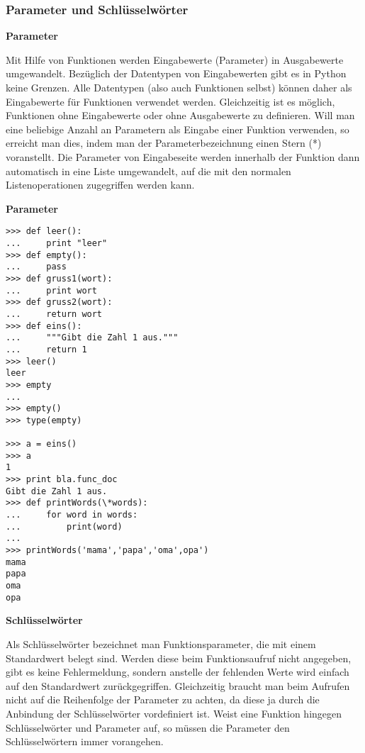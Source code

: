 \subsubsection{Parameter und Schlüsselwörter}

\vspace{0.5cm}\par\noindent\textbf{Parameter}\vspace{0.5cm}

Mit Hilfe von Funktionen werden Eingabewerte (Parameter) in Ausgabewerte
umgewandelt. Bezüglich der Datentypen von Eingabewerten gibt es in
Python keine Grenzen. Alle Datentypen (also auch Funktionen selbst)
können daher als Eingabewerte für Funktionen verwendet werden.
Gleichzeitig ist es möglich, Funktionen ohne Eingabewerte oder ohne
Ausgabewerte zu definieren. Will man eine beliebige Anzahl an Parametern
als Eingabe einer Funktion verwenden, so erreicht man dies, indem man
der Parameterbezeichnung einen Stern (*) voranstellt. Die Parameter von
Eingabeseite werden innerhalb der Funktion dann automatisch in eine
Liste umgewandelt, auf die mit den normalen Listenoperationen
zugegriffen werden kann.




\vspace{0.5cm}\par\noindent\textbf{Parameter}\vspace{0.5cm}

\begin{verbatim}
>>> def leer():
...     print "leer"
>>> def empty():
...     pass
>>> def gruss1(wort):
...     print wort
>>> def gruss2(wort):
...     return wort
>>> def eins():
...     """Gibt die Zahl 1 aus."""
...     return 1
>>> leer()
leer
>>> empty
... 
>>> empty()
>>> type(empty)

>>> a = eins()
>>> a
1
>>> print bla.func_doc
Gibt die Zahl 1 aus.
>>> def printWords(\*words):
...     for word in words:
...         print(word)
...
>>> printWords('mama','papa','oma',opa')
mama
papa
oma
opa
\end{verbatim}




\vspace{0.5cm}\par\noindent\textbf{Schlüsselwörter}\vspace{0.5cm}

Als Schlüsselwörter bezeichnet man Funktionsparameter, die mit einem
Standardwert belegt sind. Werden diese beim Funktionsaufruf nicht
angegeben, gibt es keine Fehlermeldung, sondern anstelle der fehlenden
Werte wird einfach auf den Standardwert zurückgegriffen. Gleichzeitig
braucht man beim Aufrufen nicht auf die Reihenfolge der Parameter zu
achten, da diese ja durch die Anbindung der Schlüsselwörter vordefiniert
ist. Weist eine Funktion hingegen Schlüsselwörter und Parameter auf, so
müssen die Parameter den Schlüsselwörtern immer vorangehen.




